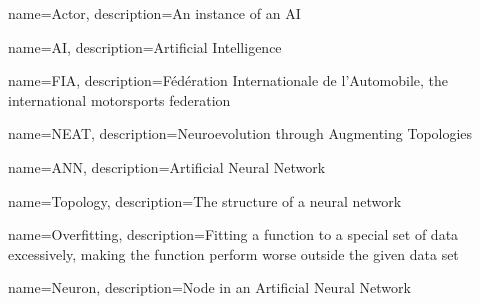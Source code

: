 {
    name=Actor,
    description={An instance of an AI}
}

{
    name=AI,
    description={Artificial Intelligence}
}

{
    name=FIA,
    description={Fédération Internationale de l'Automobile, the international motorsports federation}
}

{
    name=NEAT,
    description={Neuroevolution through Augmenting Topologies}
}

{
    name={ANN},
    description={Artificial Neural Network}
}


{
    name=Topology,
    description={The structure of a neural network}
}

{
    name=Overfitting,
    description={Fitting a function to a special set of data excessively, making the function perform worse outside the given data set}
}

{
    name=Neuron,
    description={Node in an Artificial Neural Network}
}



\glsaddall
\clearpage
\printglossary[title=Vocabulary, toctitle=Vocabulary]
